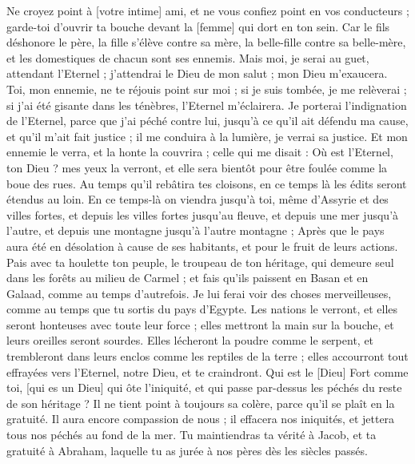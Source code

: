 \begin{multicols}{2}
Ne croyez point à [votre intime] ami, et ne vous confiez point en vos conducteurs ; garde-toi d'ouvrir ta bouche devant la [femme] qui dort en ton sein.
Car le fils déshonore le père, la fille s'élève contre sa mère, la belle-fille contre sa belle-mère, et les domestiques de chacun sont ses ennemis.
Mais moi, je serai au guet, attendant l'Eternel ; j'attendrai le Dieu de mon salut ; mon Dieu m'exaucera.
Toi, mon ennemie, ne te réjouis point sur moi ; si je suis tombée, je me relèverai ; si j'ai été gisante dans les ténèbres, l'Eternel m'éclairera.
Je porterai l'indignation de l'Eternel, parce que j'ai péché contre lui, jusqu'à ce qu'il ait défendu ma cause, et qu'il m'ait fait justice ; il me conduira à la lumière, je verrai sa justice.
Et mon ennemie le verra, et la honte la couvrira ; celle qui me disait : Où est l'Eternel, ton Dieu ? mes yeux la verront, et elle sera bientôt pour être foulée comme la boue des rues.
Au temps qu'il rebâtira tes cloisons, en ce temps là les édits seront étendus au loin.
En ce temps-là on viendra jusqu'à toi, même d'Assyrie et des villes fortes, et depuis les villes fortes jusqu'au fleuve, et depuis une mer jusqu'à l'autre, et depuis une montagne jusqu'à l'autre montagne ;
Après que le pays aura été en désolation à cause de ses habitants, et pour le fruit de leurs actions.
Pais avec ta houlette ton peuple, le troupeau de ton héritage, qui demeure seul dans les forêts au milieu de Carmel ; et fais qu'ils paissent en Basan et en Galaad, comme au temps d'autrefois.
Je lui ferai voir des choses merveilleuses, comme au temps que tu sortis du pays d'Egypte.
Les nations le verront, et elles seront honteuses avec toute leur force ; elles mettront la main sur la bouche, et leurs oreilles seront sourdes.
Elles lécheront la poudre comme le serpent, et trembleront dans leurs enclos comme les reptiles de la terre ; elles accourront tout effrayées vers l'Eternel, notre Dieu, et te craindront.
Qui est le [Dieu] Fort comme toi, [qui es un Dieu] qui ôte l'iniquité, et qui passe par-dessus les péchés du reste de son héritage ? Il ne tient point à toujours sa colère, parce qu'il se plaît en la gratuité.
Il aura encore compassion de nous ; il effacera nos iniquités, et jettera tous nos péchés au fond de la mer.
Tu maintiendras ta vérité à Jacob, et ta gratuité à Abraham, laquelle tu as jurée à nos pères dès les siècles passés.
\PPE{}
\end{multicols}
